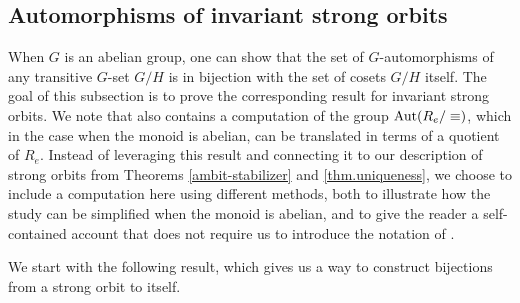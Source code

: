 \documentclass[11pt]{amsart}
\renewcommand{\ss}{\mathord{\sslash}}
\begin{document}






 
\subsection{Automorphisms of invariant strong orbits}

When $G$ is an abelian group, one can show that the set of $G$-automorphisms of any transitive $G$-set $G/H$ is in bijection with the set of cosets $G/H$ itself. The goal of this subsection is to prove the corresponding result for invariant strong orbits. We note that \cite[Theorem 3.2]{burnside} also contains a computation of the group $\mathrm{Aut}(R_e/\equiv)$, which in the case when the monoid is abelian, can be translated in terms of a quotient of $R_e$. Instead of leveraging this result and connecting it to our description of strong orbits from Theorems \ref{ambit-stabilizer} and \ref{thm.uniqueness}, we choose to include a computation here using different methods, both to illustrate how the study can be simplified when the monoid is abelian, and to give the reader a self-contained account that does not require us to introduce the notation of \cite{burnside}.

We start with the following result, which gives us a way to construct bijections from a strong orbit to itself. 
\end{document}
